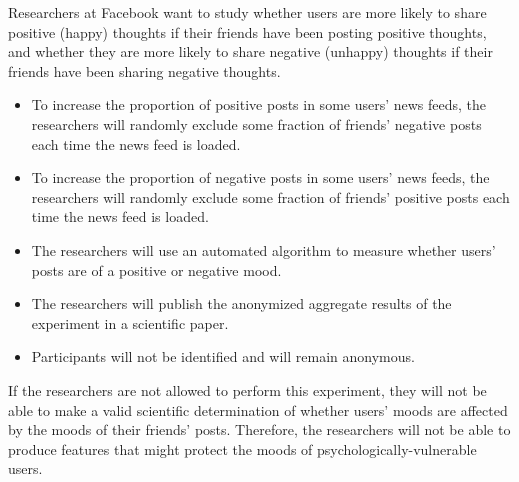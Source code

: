 




Researchers at Facebook want to study whether users are more likely to share positive (happy) thoughts if their friends have been posting positive thoughts, and whether they are more likely to share negative (unhappy) thoughts if their friends have been sharing negative thoughts.
\begin{itemize}
\item To increase the proportion of positive posts in some users' news feeds, the researchers will randomly exclude some fraction of friends' negative posts each time the news feed is loaded.
\item To increase the proportion of negative posts in some users' news feeds, the researchers will randomly exclude some fraction of friends' positive posts each time the news feed is loaded.
\item The researchers will use an automated algorithm to measure whether users' posts are of a positive or negative mood.
\item The researchers will publish the anonymized aggregate results of the experiment in a scientific paper.
\item Participants will not be identified and will remain anonymous.
\end{itemize}
If the researchers are not allowed to perform this experiment, they will not be able to make a valid scientific determination of whether users' moods are affected by the moods of their friends' posts. Therefore, the researchers will not be able to produce features that might protect the moods of psychologically-vulnerable users.




